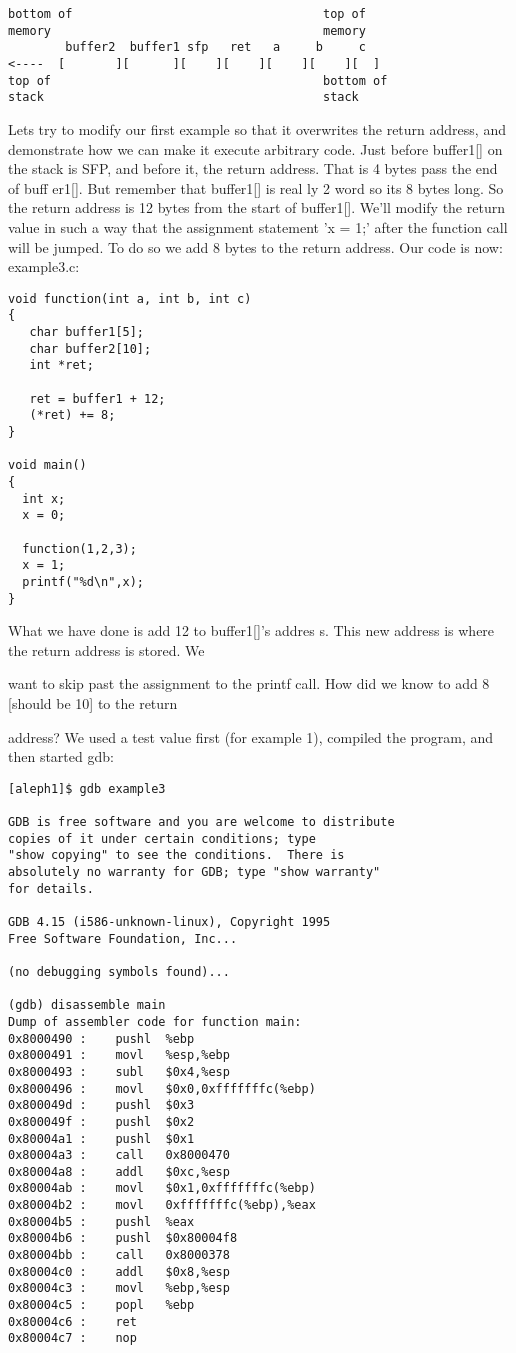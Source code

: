 \documentclass[10pt]{article}
\begin{document}
{\small
\begin{verbatim}
bottom of                                   top of
memory                                      memory
        buffer2  buffer1 sfp   ret   a     b     c
<----  [       ][      ][    ][    ][    ][    ][  ]
top of                                      bottom of
stack                                       stack
\end{verbatim}
}
Lets try to modify our first example so that it overwrites the return address, and demonstrate how we can make 
it execute arbitrary code. Just before buffer1[] on the stack is SFP, and before it, the return address. That is 4 
bytes pass the end of buff er1[]. But remember that buffer1[] is real ly 2 word so its 8 bytes long. So the return 
address is 12 bytes from the start of buffer1[]. We'll modify the return value in such a way that the assignment 
statement 'x = 1;' after the function call will be jumped. To do so we add 8 bytes to the return address. 
Our code is now: example3.c:

\begin{lstlisting}
void function(int a, int b, int c) 
{
   char buffer1[5];
   char buffer2[10];
   int *ret;

   ret = buffer1 + 12;
   (*ret) += 8;
}

void main() 
{
  int x;
  x = 0;

  function(1,2,3);
  x = 1;
  printf("%d\n",x);
}
\end{lstlisting}

What we have done is add 12 to buffer1[]'s addres s. This new address is where the return address is stored. We 

want to skip past the assignment to the printf call. How did we know to add 8 [should be 10] to the return 

address? We used a test value first (for example 1), compiled the program, and  then started gdb:

{\small
\begin{verbatim}
[aleph1]$ gdb example3

GDB is free software and you are welcome to distribute 
copies of it under certain conditions; type 
"show copying" to see the conditions.  There is 
absolutely no warranty for GDB; type "show warranty" 
for details.

GDB 4.15 (i586-unknown-linux), Copyright 1995 
Free Software Foundation, Inc...

(no debugging symbols found)...

(gdb) disassemble main
Dump of assembler code for function main:
0x8000490 :    pushl  %ebp
0x8000491 :    movl   %esp,%ebp
0x8000493 :    subl   $0x4,%esp
0x8000496 :    movl   $0x0,0xfffffffc(%ebp)
0x800049d :    pushl  $0x3
0x800049f :    pushl  $0x2
0x80004a1 :    pushl  $0x1
0x80004a3 :    call   0x8000470 
0x80004a8 :    addl   $0xc,%esp
0x80004ab :    movl   $0x1,0xfffffffc(%ebp)
0x80004b2 :    movl   0xfffffffc(%ebp),%eax
0x80004b5 :    pushl  %eax
0x80004b6 :    pushl  $0x80004f8
0x80004bb :    call   0x8000378 
0x80004c0 :    addl   $0x8,%esp
0x80004c3 :    movl   %ebp,%esp
0x80004c5 :    popl   %ebp
0x80004c6 :    ret
0x80004c7 :    nop
\end{verbatim}
}
\end{document}
